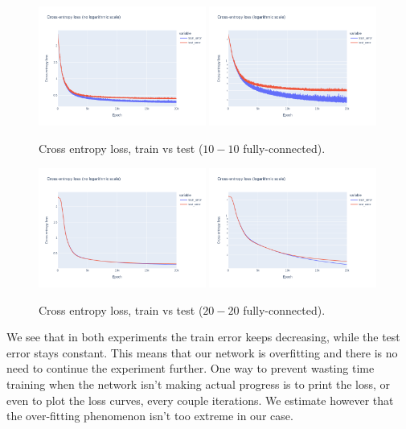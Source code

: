 \documentclass[12pt]{article}
\begin{document}
\begin{figure}[ht]
    \centering
    \includegraphics[width=0.49\textwidth]{images/cross-entropy-comparison-2-10-10.png}
    \includegraphics[width=0.49\textwidth]{images/cross-entropy-comparison-2-10-10-log.png}
    \caption{Cross entropy loss, train vs test ($10-10$ fully-connected).}
    \label{fig: loss comparison 2-10-10}
\end{figure}
\begin{figure}[ht]
    \centering
    \includegraphics[width=0.49\textwidth]{images/cross-entropy-comparison-2-20-20.png}
    \includegraphics[width=0.49\textwidth]{images/cross-entropy-comparison-2-20-20-log.png}
    \caption{Cross entropy loss, train vs test ($20-20$ fully-connected).}
    \label{fig: loss comparison 2-20-20}
\end{figure}
We see that in both experiments the train error keeps decreasing, while the test error stays constant.
This means that our network is overfitting and there is no need to continue the experiment further.
One way to prevent wasting time training when the network isn't making actual progress is to print the loss, or even to plot the loss curves, every couple iterations.
We estimate however that the over-fitting phenomenon isn't too extreme in our case.
\end{document}
